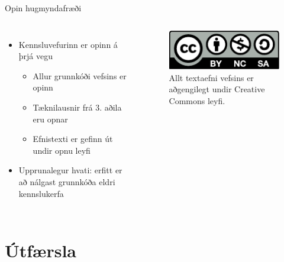 \documentclass{beamer}
\begin{document}
\begin{frame}{Opin hugmyndafræði}
    \begin{columns}
        \begin{itemize}
            \item Kennsluvefurinn er opinn á þrjá vegu
            \begin{itemize}
                \item Allur grunnkóði vefsins er opinn
                \item Tæknilausnir frá 3. aðila eru opnar
                \item Efnistexti er gefinn út undir opnu leyfi
            \end{itemize}
            \item Upprunalegur hvati: erfitt er að nálgast grunnkóða eldri kennslukerfa
        \end{itemize}
        \begin{figure}
            \caption{Allt textaefni vefsins er aðgengilegt undir Creative Commons leyfi.}
            \includegraphics[width=\linewidth]{cc-by-nc-sa}
        \end{figure}
    \end{columns}
\end{frame}

\section{Útfærsla}
\end{document}
